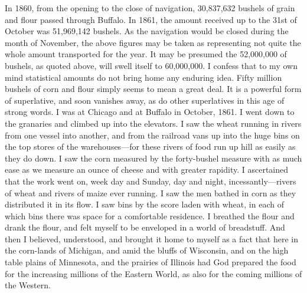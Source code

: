 In 1860, from the opening to the close of navigation, 30,837,632
bushels of grain and flour passed through Buffalo.  In 1861, the
amount received up to the 31st of October was 51,969,142 bushels.
As the navigation would be closed during the month of November, the
above figures may be taken as representing not quite the whole
amount transported for the year.  It may be presumed the 52,000,000
of bushels, as quoted above, will swell itself to 60,000,000.  I
confess that to my own mind statistical amounts do not bring home
any enduring idea.  Fifty million bushels of corn and flour simply
seems to mean a great deal.  It is a powerful form of superlative,
and soon vanishes away, as do other superlatives in this age of
strong words.  I was at Chicago and at Buffalo in October, 1861.  I
went down to the granaries and climbed up into the elevators.  I
saw the wheat running in rivers from one vessel into another, and
from the railroad vans up into the huge bins on the top stores of
the warehouses---for these rivers of food run up hill as easily as
they do down.  I saw the corn measured by the forty-bushel measure
with as much ease as we measure an ounce of cheese and with greater
rapidity.  I ascertained that the work went on, week day and
Sunday, day and night, incessantly---rivers of wheat and rivers of
maize ever running.  I saw the men bathed in corn as they
distributed it in its flow.  I saw bins by the score laden with
wheat, in each of which bins there was space for a comfortable
residence.  I breathed the flour and drank the flour, and felt
myself to be enveloped in a world of breadstuff.  And then I
believed, understood, and brought it home to myself as a fact that
here in the corn-lands of Michigan, and amid the bluffs of
Wisconsin, and on the high table plains of Minnesota, and the
prairies of Illinois had God prepared the food for the increasing
millions of the Eastern World, as also for the coming millions of
the Western.

